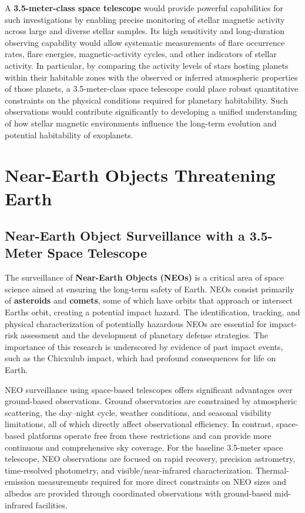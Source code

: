 A \textbf{3.5-meter-class space telescope} would provide powerful capabilities for such investigations by enabling precise monitoring of stellar magnetic activity across large and diverse stellar samples. Its high sensitivity and long-duration observing capability would allow systematic measurements of flare occurrence rates, flare energies, magnetic-activity cycles, and other indicators of stellar activity. In particular, by comparing the activity levels of stars hosting planets within their habitable zones with the observed or inferred atmospheric properties of those planets, a 3.5-meter-class space telescope could place robust quantitative constraints on the physical conditions required for planetary habitability. Such observations would contribute significantly to developing a unified understanding of how stellar magnetic environments influence the long-term evolution and potential habitability of exoplanets.

\section{Near-Earth Objects Threatening Earth}\label{near-earth-objects-threatening-earth}

\subsection{Near-Earth Object Surveillance with a 3.5-Meter Space Telescope}\label{near-earth-object-surveillance-with-a-3.5-meter-space-telescope}

The surveillance of \textbf{Near-Earth Objects (NEOs)} is a critical area of space science aimed at ensuring the long-term safety of Earth. NEOs consist primarily of \textbf{asteroids} and \textbf{comets}, some of which have orbits that approach or intersect Earth\textquotesingle s orbit, creating a potential impact hazard. The identification, tracking, and physical characterization of potentially hazardous NEOs are essential for impact-risk assessment and the development of planetary defense strategies. The importance of this research is underscored by evidence of past impact events, such as the Chicxulub impact, which had profound consequences for life on Earth.

NEO surveillance using space-based telescopes offers significant advantages over ground-based observations. Ground observatories are constrained by atmospheric scattering, the day--night cycle, weather conditions, and seasonal visibility limitations, all of which directly affect observational efficiency. In contrast, space-based platforms operate free from these restrictions and can provide more continuous and comprehensive sky coverage. 
For the baseline 3.5-meter space telescope, NEO observations are focused on rapid recovery, precision astrometry, time-resolved photometry, and visible/near-infrared characterization. Thermal-emission measurements required for more direct constraints on NEO sizes and albedos are provided through coordinated observations with ground-based mid-infrared facilities.

